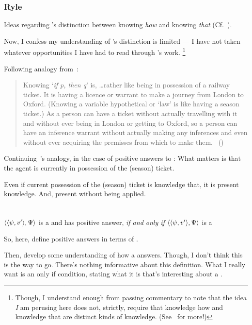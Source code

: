 \subsubsection{Ryle}

\begin{note}
  Ideas regarding \citeauthor{Ryle:1946tu}'s distinction between knowing \emph{how} and knowing \emph{that} (Cf.~\citeyear{Ryle:1946tu}).

  Now, I confess my understanding of \citeauthor{Ryle:1946tu}'s distinction is limited --- I have not taken whatever opportunities I have had to read through \citeauthor{Ryle:1946tu}'s work.%
  \footnote{
    Though, I understand enough from passing commentary to note that the idea \emph{I} am perusing here does not, strictly, require that knowledge how and knowledge that are distinct kinds of knowledge.
    (See~\textcite{Pavese:2022up} for more!)
  }

  Following analogy from~\textcite{Ryle:2009us}:

  \begin{quote}
    Knowing `\emph{if p, then q}' is, \dots rather like being in possession of a railway ticket.
    It is having a licence or warrant to make a journey from London to Oxford.
    (Knowing a variable hypothetical or `law' is like having a season ticket.)
    As a person can have a ticket without actually travelling with it and without ever being in London or getting to Oxford, so a person can have an inference warrant without actually making any inferences and even without ever acquiring the premisses from which to make them.%
    \mbox{ }\hfill\mbox{(\citeyear[250]{Ryle:2009us})}
  \end{quote}

  Continuing~\citeauthor{Ryle:2009us}'s analogy, in the case of positive answers to \qzS{}:
  What matters is that the agent is currently in possession of the (season) ticket.

  Even if current possession of the (season) ticket is knowledge that, it is present knowledge.
  And, present without being applied.
\end{note}

\section{}
\label{cha:fcs:sec:fc}

\begin{note}
  \begin{definition}
    \(\langle \langle \psi, v' \rangle, \Psi \rangle\) is a \requ{} and \qzS{} has positive answer, \emph{if and only if} \(\langle \langle \psi, v' \rangle, \Psi \rangle\) is a \fc{}
  \end{definition}
  So, here, define positive answers in terms of \fc{}.

  Then, develop some understanding of how a \fc{} answers.
  Though, I don't think this is the way to go.
  There's nothing informative about this definition.
  What I really want is an only if condition, stating what it is that's interesting about a \fc{}.
\end{note}


